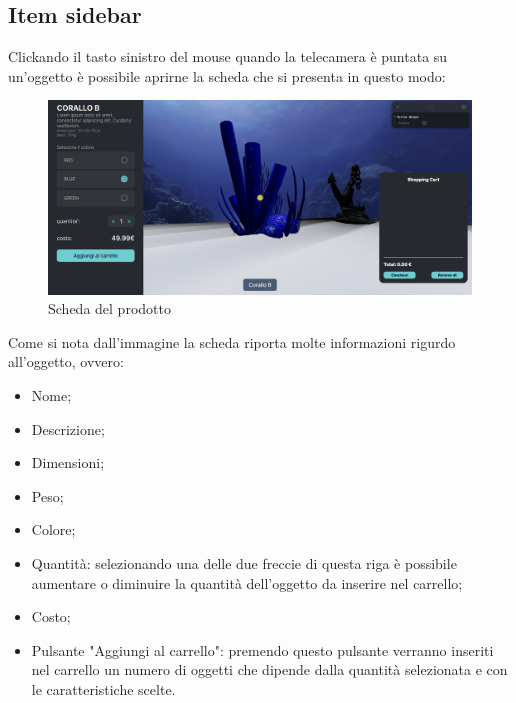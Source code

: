 \subsection{Item sidebar}
Clickando il tasto sinistro del mouse quando la telecamera è puntata su un'oggetto è possibile aprirne la scheda che si presenta in questo modo:
\begin{figure}[H]
  \renewcommand{\thefigure}{1}
\begin{center}
  \includegraphics[width=\linewidth]{./res/images/sidebar_vuota.png}
 \end{center}
 \caption{Scheda del prodotto}
  \label{Scheda del prodotto}
\end{figure}
Come si nota dall'immagine la scheda riporta molte informazioni rigurdo all'oggetto, ovvero:
\begin{itemize}
	\item Nome;
	\item Descrizione;
	\item Dimensioni;
	\item Peso;
	\item Colore;
	\item Quantità: selezionando una delle due freccie di questa riga è possibile aumentare o diminuire la quantità dell'oggetto da inserire nel carrello;
	\item Costo;
	\item Pulsante "Aggiungi al carrello": premendo questo pulsante verranno inseriti nel carrello un numero di oggetti che dipende dalla quantità selezionata e con le caratteristiche scelte.
\end{itemize}

